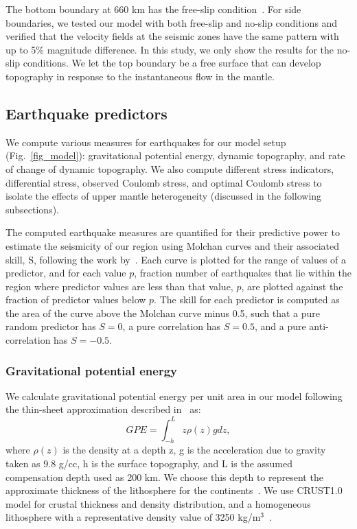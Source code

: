 \documentclass[draft,linenumbers]{agujournal2018}
\begin{document}
The bottom boundary at 660 km has the free-slip condition~\citep[e.g.,][]{arcay2007slab, billen2007rheologic, quinquis2011role}. For side boundaries, we tested our model with both free-slip and no-slip conditions and verified that the velocity fields at the seismic zones have the same pattern with up to 5\% magnitude difference. In this study, we only show the results for the no-slip conditions. We let the top boundary be a free surface that can develop topography in response to the instantaneous flow in the mantle. 

\subsection{Earthquake predictors}
We compute various measures for earthquakes for our model setup (Fig.~\ref{fig_model}): gravitational potential energy, dynamic topography, and rate of change of dynamic topography. We also compute different stress indicators, differential stress, observed Coulomb stress, and optimal Coulomb stress to isolate the effects of upper mantle heterogeneity (discussed in the following subsections). 

The computed earthquake measures are quantified for their predictive power to estimate the seismicity of our region using Molchan curves and their associated skill, S, following the work by~\citet{becker2015western}. Each curve is plotted for the range of values of a predictor, and for each value $p$, fraction number of earthquakes that lie within the region where predictor values are less than that value, $p$, are plotted against the fraction of predictor values below $p$. The skill for each predictor is computed as the area of the curve above the Molchan curve minus 0.5, such that a pure random predictor has $S=0$, a pure correlation has $S=0.5$, and a pure anti-correlation has $S=-0.5$.  

\subsubsection{Gravitational potential energy}
We calculate gravitational potential energy per unit area in our model following the thin-sheet approximation described in~\citet{ghosh2009contribution} as:
\begin{equation}
GPE = \int_{-h}^{L} z \rho(z) g dz,
\end{equation}
where $\rho(z)$ is the density at a depth z, g is the acceleration due to gravity taken as 9.8 g/cc, h is the surface topography, and L is the assumed compensation depth used as 200 km. We choose this depth to represent the approximate thickness of the lithosphere for the continents~\citep{mckenzie2005thermal}. We use CRUST1.0~\citep{laske2013update} model for crustal thickness and density distribution, and a homogeneous lithosphere with a representative density value of 3250 kg/m$^3$~\citep{becker2014static}. 
\end{document}
